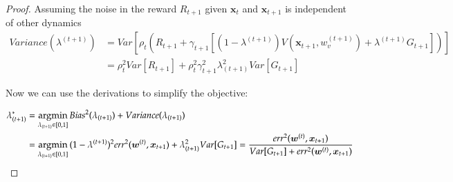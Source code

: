 \begin{proof}
Assuming the noise in the reward $R_{t+1}$ given $\bm{x}_{t}$ and $\bm{x}_{t+1}$ is independent of other dynamics
\begin{equation}
\begin{aligned}
Variance(\lambda^{(t+1)}) & = Var[\rho_t(R_{t+1} + \gamma_{t+1} [(1 - \lambda^{(t+1)})V(\bm{x}_{t+1}, w_v^{(t+1)}) + \lambda^{(t+1)} G_{t+1}])]\\
& = \rho_t^2Var[R_{t+1}] + \rho_t^2\gamma_{t+1}^2\lambda_{(t+1)}^2 Var[ G_{t+1}]%
\end{aligned}  
\end{equation}

Now we can use the derivations to simplify the objective:

\begin{equation}
\begin{aligned}
\lambda_{(t+1)}^* %
& = \argmin_{\lambda_{(t+1)} \in [0, 1]}{{Bias}^2(\lambda_{(t+1)}) + Variance(\lambda_{(t+1)})}\\
& = \argmin_{\lambda_{(t+1)} \in [0, 1]}{(1 - \lambda^{(t+1)})^2 {err}^2(\bm{w}^{(t)}, \bm{x}_{t+1}) + \lambda_{(t+1)}^2 Var[G_{t+1}]} = \frac{{err}^2(\bm{w}^{(t)}, \bm{x}_{t+1})}{Var[G_{t+1}] + {err}^2(\bm{w}^{(t)}, \bm{x}_{t+1})}
\end{aligned}
\end{equation}
\end{proof}


